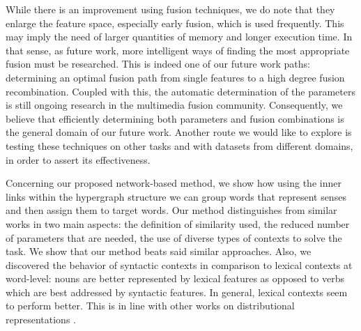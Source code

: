 While there is an improvement using fusion techniques, we do note that they  enlarge the feature space, especially early fusion, which is used frequently. This may imply the need of larger quantities of memory and longer execution time. In that sense, as future work, more intelligent ways of finding the most appropriate fusion must be researched. This is indeed one of our future work paths: determining an optimal fusion path from single features to a high degree fusion recombination. Coupled with this, the automatic determination of the parameters is still ongoing research in the multimedia fusion community. Consequently, we believe that efficiently determining both parameters and fusion combinations is the general domain of our future work. Another route we would like to explore is testing these techniques on other tasks and with datasets from different domains, in order to assert its effectiveness.


Concerning our proposed network-based method, we show how using the inner links within the hypergraph structure we can group words that represent senses and then assign them to target words. Our method distinguishes from similar works in two main aspects: the definition of similarity used, the reduced number of parameters that are needed, the use of diverse types of contexts to solve the task. 	We show that our method beats said similar approaches. Also, we discovered the behavior of syntactic contexts in comparison to lexical contexts at word-level: nouns are better represented by lexical features as opposed to verbs which are best addressed by syntactic features. In general, lexical contexts seem to perform better. This is in line with other works on distributional representations \cite{kiela2014systematic}.




